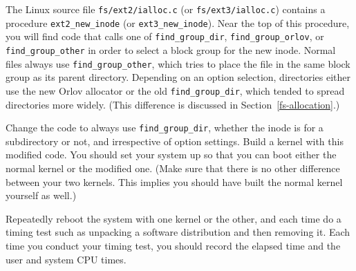 \begin{chapterEnumerate}
The Linux source file \verb|fs/ext2/ialloc.c| (or
\verb|fs/ext3/ialloc.c|) contains a procedure \verb|ext2_new_inode|
(or
\verb|ext3_new_inode|).  Near the top of this procedure, you will find
code that calls one of \verb|find_group_dir|, \verb|find_group_orlov|,
or \verb|find_group_other| in order to select a block group for the
new inode.  Normal files always use \verb|find_group_other|, which
tries to place the file in the same block group as its parent
directory.  Depending on an option selection, directories either use
the new Orlov allocator or the old \verb|find_group_dir|, which tended
to spread directories more widely.  (This difference is discussed in
Section~\ref{fs-allocation}.)

Change the code to always use \verb|find_group_dir|, whether the inode
is for a subdirectory or not, and irrespective of option settings.
Build a kernel with this modified code.  You should set your system up
so that you can boot either the normal kernel or the modified one.  (Make
sure that there is no other difference between your two kernels.  This
implies you should have built the normal kernel yourself as well.)

Repeatedly reboot the system with one kernel or the other, and each
time do a timing test such as unpacking a software distribution and
then removing it.  Each time you conduct your timing test, you should
record the elapsed time and the user and system CPU times.


\end{chapterEnumerate}
